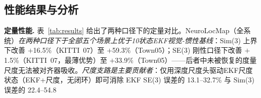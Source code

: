 \subsection{性能结果与分析}

\textbf{定量性能.} 表~\ref{tab:results} 给出了两种口径下的定量对比。NeuroLocMap（全系统）\emph{在两种口径下于全部五个场景上优于10状态EKF视觉-惯性基线}：Sim(3) 上界下改善 $+$16.5\%（KITTI~07）至 $+$59.3\%（Town05）；SE(3) 刚性口径下改善 $+$1.5\%（KITTI~07，最薄优势）至 $+$33.9\%（Town05）——后者中未被恢复的度量尺度无法被对齐器吸收。\emph{尺度支路是主要贡献者}：仅用深度尺度头驱动EKF尺度状态（EKF+尺度，无闭环）即可消除 EKF SE(3) 误差的 13.1--32.7\% 与 Sim(3) 误差的 22.4--54.8%

